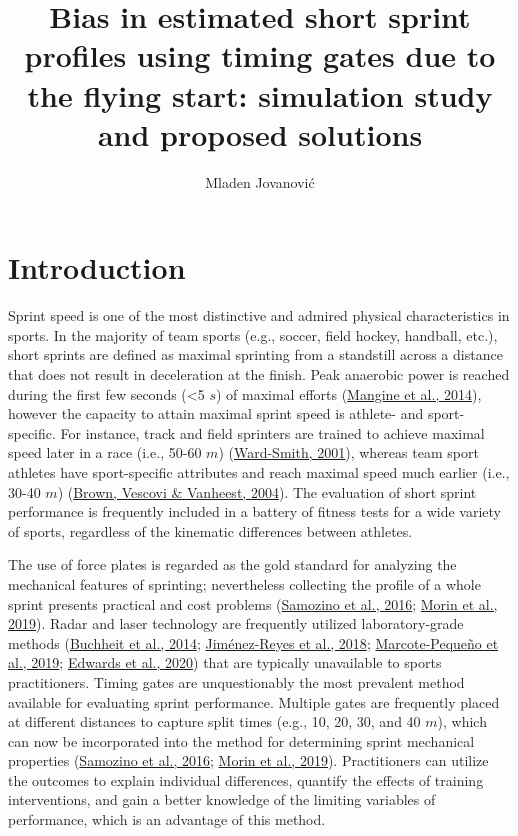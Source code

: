 \documentclass[fleqn,10pt,lineno]{wlpeerj} %
\title{Bias in estimated short sprint profiles using timing gates due to the flying start: simulation study and proposed solutions}
\author[1]{Mladen Jovanović}
\affil[1]{Faculty of Sport and Physical Education, University of Belgrade, Serbia}
\begin{document}
\flushbottom
\maketitle
\thispagestyle{empty}

\hypertarget{introduction}{%
\section{Introduction}\label{introduction}}

Sprint speed is one of the most distinctive and admired physical characteristics in sports. In the majority of team sports (e.g., soccer, field hockey, handball, etc.), short sprints are defined as maximal sprinting from a standstill across a distance that does not result in deceleration at the finish. Peak anaerobic power is reached during the first few seconds (\textless5 \(s\)) of maximal efforts (\protect\hyperlink{ref-mangineSpeedForcePower2014}{Mangine et al., 2014}), however the capacity to attain maximal sprint speed is athlete- and sport-specific. For instance, track and field sprinters are trained to achieve maximal speed later in a race (i.e., 50-60 \(m\)) (\protect\hyperlink{ref-ward-smithEnergyConversionStrategies2001}{Ward-Smith, 2001}), whereas team sport athletes have sport-specific attributes and reach maximal speed much earlier (i.e., 30-40 \(m\)) (\protect\hyperlink{ref-brownAssessmentLinearSprinting2004}{Brown, Vescovi \& Vanheest, 2004}). The evaluation of short sprint performance is frequently included in a battery of fitness tests for a wide variety of sports, regardless of the kinematic differences between athletes.

The use of force plates is regarded as the gold standard for analyzing the mechanical features of sprinting; nevertheless collecting the profile of a whole sprint presents practical and cost problems (\protect\hyperlink{ref-samozinoSimpleMethodMeasuring2016}{Samozino et al., 2016}; \protect\hyperlink{ref-morinSimpleMethodComputing2019}{Morin et al., 2019}). Radar and laser technology are frequently utilized laboratory-grade methods (\protect\hyperlink{ref-buchheitMechanicalDeterminantsAcceleration2014}{Buchheit et al., 2014}; \protect\hyperlink{ref-jimenez-reyesRelationshipVerticalHorizontal2018}{Jiménez-Reyes et al., 2018}; \protect\hyperlink{ref-marcote-pequenoAssociationForceVelocity2019}{Marcote-Pequeño et al., 2019}; \protect\hyperlink{ref-edwardsSprintAccelerationCharacteristics2020}{Edwards et al., 2020}) that are typically unavailable to sports practitioners. Timing gates are unquestionably the most prevalent method available for evaluating sprint performance. Multiple gates are frequently placed at different distances to capture split times (e.g., 10, 20, 30, and 40 \(m\)), which can now be incorporated into the method for determining sprint mechanical properties (\protect\hyperlink{ref-samozinoSimpleMethodMeasuring2016}{Samozino et al., 2016}; \protect\hyperlink{ref-morinSimpleMethodComputing2019}{Morin et al., 2019}). Practitioners can utilize the outcomes to explain individual differences, quantify the effects of training interventions, and gain a better knowledge of the limiting variables of performance, which is an advantage of this method.
\end{document}
